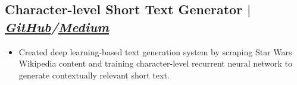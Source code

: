 \documentclass[11pt]{article} %
\begin{document}
\subsection{Character-level Short Text Generator $|$ \normalfont\textit{\href{https://github.com/Pedrohgv/Star-Wars-Text-Generation}{GitHub}/\href{https://towardsdatascience.com/generating-short-star-wars-text-with-lstms-c7dc65e252c4/}{Medium}}}
\begin{itemize}
  \item Created deep learning-based text generation system by scraping Star Wars Wikipedia content and training character-level recurrent neural network to generate contextually relevant short text.
\end{itemize}
\end{document}
